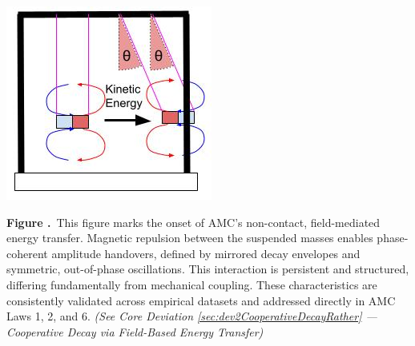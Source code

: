 \documentclass[10pt,aps,pre,onecolumn,superscriptaddress,notitlepage]{revtex4-2}
\renewcommand{\thefigure}{\arabic{figure}}
\begin{document}
\begin{center}
  \begin{minipage}[c]{0.36\linewidth}
    \includegraphics[width=\linewidth]{figures/AK1_AMC_RMI_MOTION_2.jpg}
  \end{minipage}%
  \hfill
  \begin{minipage}[c]{0.5\linewidth}
    \textbf{Figure \thefigure.}~This figure marks the onset of AMC’s non-contact, field-mediated energy transfer. Magnetic repulsion between the suspended masses enables phase-coherent amplitude handovers, defined by mirrored decay envelopes and symmetric, out-of-phase oscillations. This interaction is persistent and structured, differing fundamentally from mechanical coupling. These characteristics are consistently validated across empirical datasets and addressed directly in AMC Laws 1, 2, and 6. \textit{(See Core Deviation \ref{sec:dev2CooperativeDecayRather} — Cooperative Decay via Field-Based Energy Transfer)}
    \label{fig:amc_motion_onset}
  \end{minipage}

  \vspace{1.7cm}


\end{center}
\end{document}
